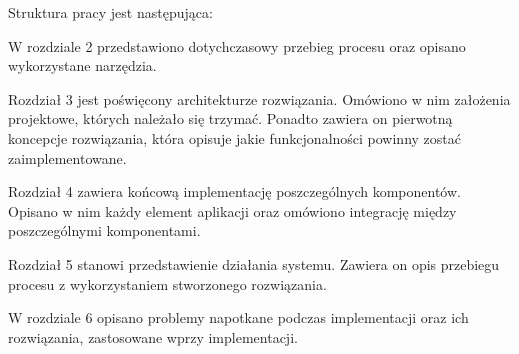 
\vspace{0.5cm}
Struktura pracy jest następująca:

\noindent W rozdziale 2  przedstawiono dotychczasowy przebieg procesu oraz opisano wykorzystane narzędzia. 

\noindent Rozdział 3 jest poświęcony architekturze rozwiązania. Omówiono w nim założenia projektowe, których należało się trzymać. Ponadto zawiera on pierwotną koncepcje rozwiązania, która opisuje jakie funkcjonalności powinny zostać zaimplementowane. 

\noindent Rozdział 4 zawiera końcową implementację poszczególnych komponentów. Opisano w nim każdy element aplikacji oraz omówiono integrację między poszczególnymi komponentami. 

\noindent Rozdział 5 stanowi przedstawienie działania systemu. Zawiera on opis przebiegu procesu z wykorzystaniem stworzonego rozwiązania.

\noindent W rozdziale 6 opisano problemy napotkane podczas implementacji oraz ich rozwiązania, zastosowane wprzy implementacji.

